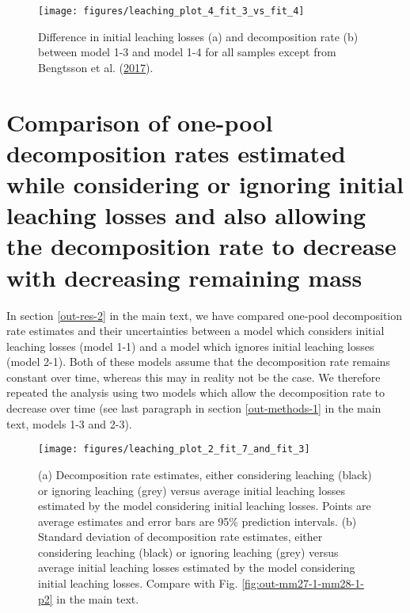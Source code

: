 \documentclass[
  12pt,
]{article}
\begin{document}
\begin{figure}[H]

{\centering \texttt{[image: figures/leaching\_plot\_4\_fit\_3\_vs\_fit\_4]} 

}

\caption{Difference in initial leaching losses (a) and decomposition rate (b) between model 1-3 and model 1-4 for all samples except from Bengtsson et al. (\protect\hyperlink{ref-Bengtsson.2017}{2017}).}\label{fig:sup-out-sdm-mm36-1-mm36-2-parameter-difference-p1-1}
\end{figure}

\hypertarget{sup-4}{%
\section{Comparison of one-pool decomposition rates estimated while considering or ignoring initial leaching losses and also allowing the decomposition rate to decrease with decreasing remaining mass}\label{sup-4}}

In section \ref{out-res-2} in the main text, we have compared one-pool decomposition rate estimates and their uncertainties between a model which considers initial leaching losses (model 1-1) and a model which ignores initial leaching losses (model 2-1). Both of these models assume that the decomposition rate remains constant over time, whereas this may in reality not be the case. We therefore repeated the analysis using two models which allow the decomposition rate to decrease over time (see last paragraph in section \ref{out-methods-1} in the main text, models 1-3 and 2-3).



\begin{figure}[H]

{\centering \texttt{[image: figures/leaching\_plot\_2\_fit\_7\_and\_fit\_3]} 

}

\caption{(a) Decomposition rate estimates, either considering leaching (black) or ignoring leaching (grey) versus average initial leaching losses estimated by the model considering initial leaching losses. Points are average estimates and error bars are 95\% prediction intervals. (b) Standard deviation of decomposition rate estimates, either considering leaching (black) or ignoring leaching (grey) versus average initial leaching losses estimated by the model considering initial leaching losses. Compare with Fig. \ref{fig:out-mm27-1-mm28-1-p2} in the main text.}\label{fig:sup-out-mm36-1-mm35-1-p3-1}
\end{figure}
\end{document}
